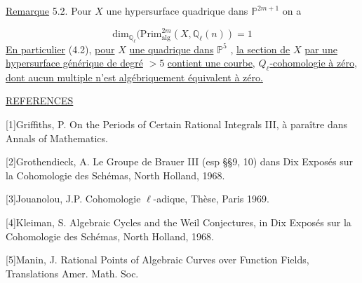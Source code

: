 \underline{Remarque} 5.2.  Pour $X$ une hypersurface quadrique dans $\mathbb{P}^{2m+1}$ on a

\begin{equation*}
\mathrm{dim}_{\mathbb{Q}_{\ell}}(\mathrm{Prim}^{2m}_{\mathrm{alg}}(X,\mathbb{Q}_{\ell}(n)) = 1
\end{equation*}
\underline{En particulier} (4.2), \underline{pour} $X$ \underline{une quadrique dans} $\mathbb{P}^5$ , \underline{la section de} $X$ \underline{par une hypersurface générique de degré} $> 5$ \underline{contient une courbe,} $Q_{\ell}$\underline{-cohomologie à zéro}, \underline{dont aucun multiple n'est algébriquement équivalent à zéro.}


\underline{REFERENCES}

[1]\quad Griffiths, P.  On the Periods of Certain Rational Integrals III, à paraître dans Annals of Mathematics.

[2]\quad Grothendieck, A.  Le Groupe de Brauer III (esp \S\S 9, 10) dans Dix Exposés sur la Cohomologie des Schémas, North Holland, 1968.

[3]\quad Jouanolou, J.P.  Cohomologie $\ell$-adique, Thèse, Paris 1969.

[4]\quad Kleiman, S.  Algebraic Cycles and the Weil Conjectures, in Dix Exposés sur la Cohomologie des Schémas, North Holland, 1968.

[5]\quad Manin, J.  Rational Points of Algebraic Curves over Function Fields, Translations Amer. Math. Soc.
